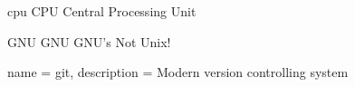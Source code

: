 \newacronym
  {cpu}
  {CPU}
  {Central Processing Unit}
  
\newacronym
  {GNU}
  {GNU}
  {GNU's Not Unix!}

{
  name = git,
  description = {
    Modern version controlling system
  }
}
